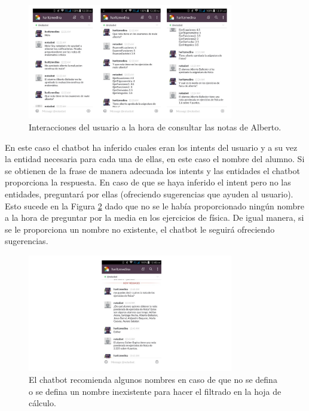 \begin{figure}[htb]
	\centering
	\includegraphics[width=0.8\textwidth]{./figs/ejecucionNotas1.png}
	\caption{Interacciones del usuario a la hora de consultar las notas de Alberto.}
	\label{fig:EjecucionNotas1}
\end{figure}

En este caso el chatbot ha inferido cuales eran los intents del usuario y a su vez la entidad necesaria para cada una de ellas, en este caso el nombre del alumno. Si se obtienen de la frase de manera adecuada los intents y las entidades el chatbot proporciona la respuesta. En caso de que se haya inferido el intent pero no las entidades, preguntará por ellas (ofreciendo sugerencias que ayuden al usuario). Esto sucede en la Figura \ref{fig:EjecucionNotas2} dado que no se le había proporcionado ningún nombre a la hora de preguntar por la media en los ejercicios de física. De igual manera, si se le proporciona un nombre no existente, el chatbot le seguirá ofreciendo sugerencias.

\begin{figure}[htb]
	\centering
	\includegraphics[width=0.8\textwidth]{./figs/ejecucionNotas2.png}
	\caption{El chatbot recomienda algunos nombres en caso de que no se defina o se defina un nombre inexistente para hacer el filtrado en la hoja de cálculo.}
	\label{fig:EjecucionNotas2}
\end{figure}


